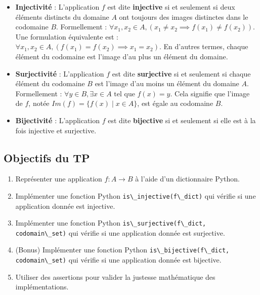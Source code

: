 \documentclass[12pt,a4paper]{report}
\newcommand{\passthrough}[1]{#1}
\providecommand{\tightlist}{%
  \setlength{\itemsep}{0pt}\setlength{\parskip}{0pt}}
\begin{document}
\begin{itemize}
\item
  \textbf{Injectivité} : L'application \(f\) est dite \textbf{injective}
  si et seulement si deux éléments distincts du domaine \(A\) ont
  toujours des images distinctes dans le codomaine \(B\). Formellement :
  \(\forall x_1, x_2 \in A, (x_1 \neq x_2 \implies f(x_1) \neq f(x_2))\).
  Une formulation équivalente est :
  \(\forall x_1, x_2 \in A, (f(x_1) = f(x_2) \implies x_1 = x_2)\). En
  d'autres termes, chaque élément du codomaine est l'image d'au plus un
  élément du domaine.
\item
  \textbf{Surjectivité} : L'application \(f\) est dite
  \textbf{surjective} si et seulement si chaque élément du codomaine
  \(B\) est l'image d'au moins un élément du domaine \(A\). Formellement
  : \(\forall y \in B, \exists x \in A \text{ tel que } f(x) = y\). Cela
  signifie que l'image de \(f\), notée
  \(Im(f) = \{f(x) \mid x \in A\}\), est égale au codomaine \(B\).
\item
  \textbf{Bijectivité} : L'application \(f\) est dite \textbf{bijective}
  si et seulement si elle est à la fois injective et surjective.
\end{itemize}

\subsection{Objectifs du TP}\label{objectifs-du-tp}

\begin{enumerate}
\def\labelenumi{\arabic{enumi}.}
\tightlist
\item
  Représenter une application \(f: A \to B\) à l'aide d'un dictionnaire
  Python.
\item
  Implémenter une fonction Python
  \passthrough{\lstinline!is\_injective(f\_dict)!} qui vérifie si une
  application donnée est injective.
\item
  Implémenter une fonction Python
  \passthrough{\lstinline!is\_surjective(f\_dict, codomain\_set)!} qui
  vérifie si une application donnée est surjective.
\item
  (Bonus) Implémenter une fonction Python
  \passthrough{\lstinline!is\_bijective(f\_dict, codomain\_set)!} qui
  vérifie si une application donnée est bijective.
\item
  Utiliser des assertions pour valider la justesse mathématique des
  implémentations.
\end{enumerate}
\end{document}
